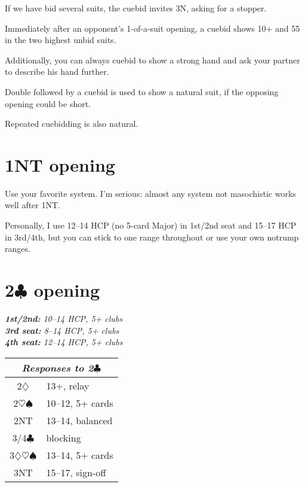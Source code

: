 \documentclass[a4paper, twoside, 11pt]{article}
\begin{document}
\begin{multicols}{3}
If we have bid several suits, the cuebid invites 3N, asking for a stopper.

Immediately after an opponent's 1-of-a-suit opening, a cuebid shows 10+ and 55 in the two highest unbid suits.

Additionally, you can always cuebid to show a strong hand and ask your partner to describe his hand further.

Double followed by a cuebid is used to
show a natural suit, if the opposing opening could be short.

Repeated cuebidding is also natural.

\section{1NT opening}

\normalfont
Use your favorite system. I'm serious: almost any system not masochistic works well after 1NT.

Personally, I use 12--14 HCP (no 5-card Major) in 1st/2nd seat and 15--17 HCP in 3rd/4th, but you can stick to one range throughout or use your own notrump ranges.



\section{2$\clubsuit$ opening}


\emph{\textbf{1st/2nd:} 10--14 HCP, 5+ clubs \\
\textbf{3rd seat:} 8--14 HCP, 5+ clubs \\
\textbf{4th seat:} 12--14 HCP, 5+ clubs}

\begin{center}
\begin{tabular}{ |c|l| }
 \hline
 \multicolumn{2}{|c|}{\textit{Responses to 2$\clubsuit$}} \\
 \hline
 2$\diamondsuit$ & 13+, relay\\
 2$\heartsuit\spadesuit$ & 10--12, 5+ cards\\
 2NT &  13--14, balanced\\
3/4$\clubsuit$ & blocking\\
 3$\diamondsuit\heartsuit\spadesuit$ & 13--14, 5+ cards \\
 3NT & 15--17, sign-off \\
 \hline
\end{tabular}
\end{center}


\end{multicols}
\end{document}
